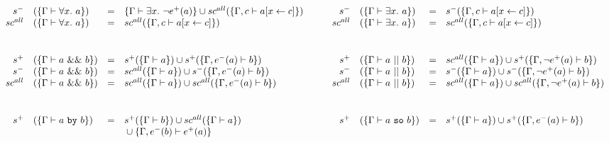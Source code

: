 \documentclass[12pt]{article}
\newcommand{\dbar}{~||~}
\newcommand{\damp}{~\&\&~}
\newcommand{\so}{~\texttt{so}~}
\newcommand{\by}{~\texttt{by}~}
\begin{document}
\begin{landscape}
\[\begin{array}{rlcl c rlcl}
      s^-      & (\{\Gamma \vdash \forall x.~ a\})       & = & \{\Gamma \vdash \exists x.~ \neg e^+(a)\} \cup sc^{all} (\{\Gamma, c\vdash a[x\leftarrow c]\})
               & \quad                                   &
      s^-      & (\{\Gamma \vdash \exists x.~ a\})       & = & s^- (\{\Gamma, c \vdash a[x\leftarrow c]\})                                                    \\

      sc^{all} & (\{\Gamma \vdash \forall x.~ a\})       & = & sc^{all} (\{\Gamma, c\vdash a[x\leftarrow c]\})
               & \quad                                   &
      sc^{all} & (\{\Gamma \vdash \exists x.~ a\})       & = & sc^{all} (\{\Gamma, c\vdash a[x\leftarrow c]\})                                                \\
      \\[1.5em]
      s^+      & (\{\Gamma \vdash a \damp b\})           & = & s^{+}(\{\Gamma \vdash a\}) \cup s^+ (\{\Gamma, e^-(a) \vdash b \})
               & \quad                                   &
      s^+      & (\{\Gamma \vdash a \dbar b\})           & = & sc^{all}(\{\Gamma \vdash a\}) \cup s^+ (\{\Gamma,\neg e^+(a) \vdash b\})                       \\

      s^-      & (\{\Gamma \vdash a \damp b\})           & = & sc^{all} (\{\Gamma \vdash a\}) \cup s^- (\{\Gamma, e^- (a)\vdash b\})
               & \quad                                   &
      s^-      & (\{\Gamma \vdash a \dbar b\})           & = & s^- (\{\Gamma \vdash a\}) \cup s^- (\{\Gamma, \neg e^+ (a) \vdash b\})                         \\

      sc^{all} & (\{\Gamma \vdash a \damp b\})           & = & sc^{all} (\{\Gamma \vdash a\}) \cup sc^{all} (\{\Gamma, e^- (a) \vdash b \})
               & \quad                                   &
      sc^{all} & (\{\Gamma \vdash a \dbar b\})           & = & sc^{all}(\{\Gamma \vdash a\}) \cup sc^{all}(\{\Gamma, \neg e^+ (a) \vdash b\})                 \\
      \\[1.5em]
      s^+      & (\{\Gamma \vdash a \by b\})             & = & s^+(\{\Gamma \vdash b \}) \cup sc^{all}(\{\Gamma \vdash a\})
               & \quad                                   &
      s^+      & (\{\Gamma \vdash a \so b\})             & = & s^+(\{\Gamma \vdash a\}) \cup s^+(\{\Gamma, e^-(a) \vdash b\})                                 \\
               &                                         &   & {} \cup \{\Gamma, e^-(b) \vdash e^+(a)\}
               &                                         &
               &                                         &   &                                                                                                \\[.8em]


\end{array}\]
\end{landscape}
\end{document}

